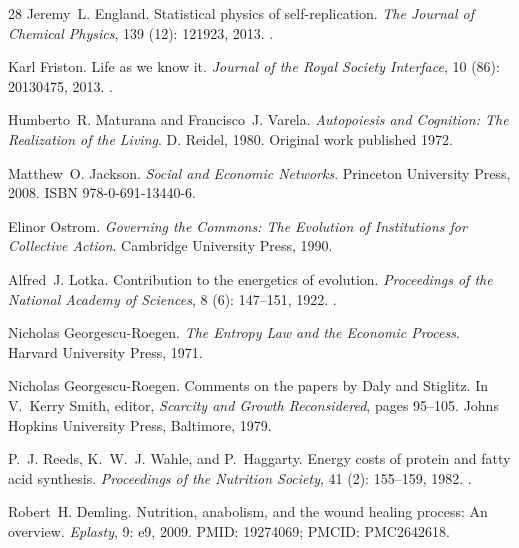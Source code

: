 \documentclass[11pt]{article}
\theoremstyle{plain}
\theoremstyle{definition}
\theoremstyle{remark}
\begin{document}
\begin{thebibliography}{28}
Jeremy~L. England.
\newblock Statistical physics of self-replication.
\newblock \emph{The Journal of Chemical Physics}, 139 (12):
  121923, 2013.
\newblock {}.

Karl Friston.
\newblock Life as we know it.
\newblock \emph{Journal of the Royal Society Interface}, 10
  (86): 20130475, 2013.
\newblock {}.

Humberto~R. Maturana and Francisco~J. Varela.
\newblock \emph{Autopoiesis and Cognition: The Realization of the Living}.
\newblock D. Reidel, 1980.
\newblock Original work published 1972.

Matthew~O. Jackson.
\newblock \emph{Social and Economic Networks}.
\newblock Princeton University Press, 2008.
\newblock ISBN 978-0-691-13440-6.

Elinor Ostrom.
\newblock \emph{Governing the Commons: The Evolution of Institutions for
  Collective Action}.
\newblock Cambridge University Press, 1990.

Alfred~J. Lotka.
\newblock Contribution to the energetics of evolution.
\newblock \emph{Proceedings of the National Academy of Sciences}, 8
  (6): 147--151, 1922.
\newblock {}.

Nicholas Georgescu-Roegen.
\newblock \emph{The Entropy Law and the Economic Process}.
\newblock Harvard University Press, 1971.

Nicholas Georgescu-Roegen.
\newblock Comments on the papers by {Daly} and {Stiglitz}.
\newblock In V.~Kerry Smith, editor, \emph{Scarcity and Growth Reconsidered},
  pages 95--105. Johns Hopkins University Press, Baltimore, 1979.

P.~J. Reeds, K.~W.~J. Wahle, and P.~Haggarty.
\newblock Energy costs of protein and fatty acid synthesis.
\newblock \emph{Proceedings of the Nutrition Society}, 41
  (2): 155--159, 1982.
\newblock {}.

Robert~H. Demling.
\newblock Nutrition, anabolism, and the wound healing process: An overview.
\newblock \emph{Eplasty}, 9: e9, 2009.
\newblock PMID: 19274069; PMCID: PMC2642618.


\end{thebibliography}
\end{document}
